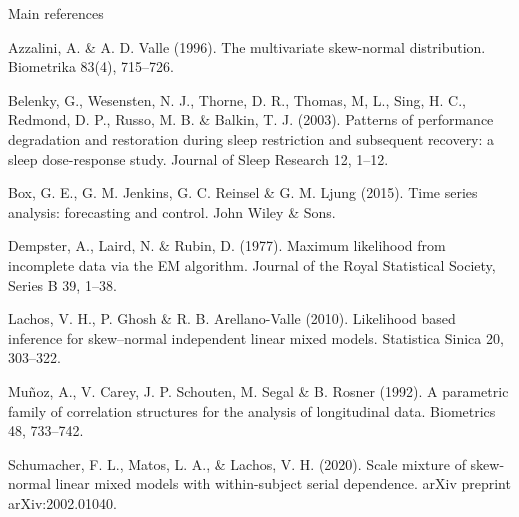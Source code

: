 \begin{frame}{Main references}
\protect\hypertarget{references}{}
\vspace{-.2cm}
\tiny{
\begin{thebibliography}{99} %
 Azzalini, A. \& A. D. Valle (1996).
\newblock The multivariate skew-normal distribution.
\newblock Biometrika 83(4), 715–726.

 Belenky, G., Wesensten, N. J., Thorne, D. R., Thomas, M, L., Sing, H. C., Redmond, D. P., Russo, M. B. \& Balkin, T. J. (2003).
\newblock Patterns of performance degradation and restoration during sleep restriction and subsequent recovery: a sleep
  dose-response study. 
\newblock Journal of Sleep Research 12, 1--12.

 Box, G. E., G. M. Jenkins, G. C. Reinsel \& G. M. Ljung (2015).
\newblock Time series analysis: forecasting and control.
\newblock John Wiley \& Sons.

 Dempster, A., Laird, N. \& Rubin, D. (1977).
\newblock Maximum likelihood from incomplete data via the EM algorithm.
\newblock Journal of the Royal Statistical Society, Series B 39, 1–38.

 Lachos, V. H., P. Ghosh \& R. B. Arellano-Valle (2010).
\newblock Likelihood based inference for skew–normal independent linear mixed models.
\newblock Statistica Sinica 20, 303–322.

 Muñoz, A., V. Carey, J. P. Schouten, M. Segal \& B. Rosner (1992).
\newblock A parametric family of correlation structures for the analysis of longitudinal data.
\newblock Biometrics 48, 733–742.

 Schumacher, F. L., Matos, L. A., \& Lachos, V. H. (2020).
\newblock Scale mixture of skew-normal linear mixed models with within-subject serial dependence. 
\newblock arXiv preprint arXiv:2002.01040.

\end{thebibliography}
}
\end{frame}

